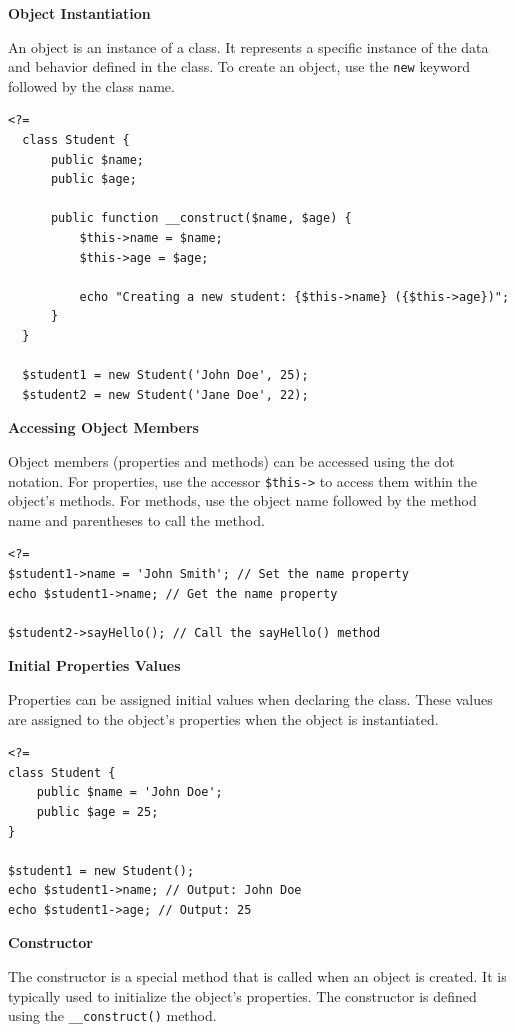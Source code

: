 \documentclass[11pt]{article}
\begin{document}
\textbf{Object Instantiation}

An object is an instance of a class. It represents a specific instance
of the data and behavior defined in the class. To create an object, use
the \texttt{new} keyword followed by the class name.

\begin{verbatim}
<?=
  class Student {
      public $name;
      public $age;

      public function __construct($name, $age) {
          $this->name = $name;
          $this->age = $age;

          echo "Creating a new student: {$this->name} ({$this->age})";
      }
  }

  $student1 = new Student('John Doe', 25);
  $student2 = new Student('Jane Doe', 22);
\end{verbatim}

\textbf{Accessing Object Members}

Object members (properties and methods) can be accessed using the dot
notation. For properties, use the accessor \texttt{\$this->} to access them
within the object's methods. For methods, use the object name followed
by the method name and parentheses to call the method.

\begin{verbatim}
<?=
$student1->name = 'John Smith'; // Set the name property
echo $student1->name; // Get the name property

$student2->sayHello(); // Call the sayHello() method
\end{verbatim}

\textbf{Initial Properties Values}

Properties can be assigned initial values when declaring the class.
These values are assigned to the object's properties when the object is
instantiated.

\begin{verbatim}
<?=
class Student {
    public $name = 'John Doe';
    public $age = 25;
}

$student1 = new Student();
echo $student1->name; // Output: John Doe
echo $student1->age; // Output: 25
\end{verbatim}

\textbf{Constructor}

The constructor is a special method that is called when an object is
created. It is typically used to initialize the object's properties. The
constructor is defined using the \texttt{\_\_construct()} method.
\end{document}
